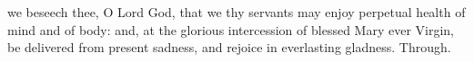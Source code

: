 \collect
{} we beseech thee, O Lord God, that we thy servants may enjoy perpetual health of mind and of body: and, at the glorious intercession of blessed Mary ever Virgin, be delivered from present sadness, and rejoice in everlasting gladness. Through.

%
%
%
%
%
%
%
%
%
%
%
%
%
%
%
%

